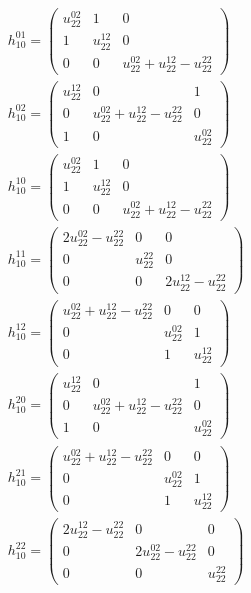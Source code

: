 \documentclass[a4paper, 11pt, twoside, onecolumn]{article}
\begin{document}
\begin{landscape}
\begin{gather*}
	 h_10^{01}=\begin{pmatrix}u^{02}_{22} & 1 & 0\\1 & u^{12}_{22} & 0\\0 & 0 & u^{02}_{22} + u^{12}_{22} - u^{22}_{22}\end{pmatrix}\\ 
	 h_10^{02}=\begin{pmatrix}u^{12}_{22} & 0 & 1\\0 & u^{02}_{22} + u^{12}_{22} - u^{22}_{22} & 0\\1 & 0 & u^{02}_{22}\end{pmatrix}\\ 
	 h_10^{10}=\begin{pmatrix}u^{02}_{22} & 1 & 0\\1 & u^{12}_{22} & 0\\0 & 0 & u^{02}_{22} + u^{12}_{22} - u^{22}_{22}\end{pmatrix}\\ 
	 h_10^{11}=\begin{pmatrix}2 u^{02}_{22} - u^{22}_{22} & 0 & 0\\0 & u^{22}_{22} & 0\\0 & 0 & 2 u^{12}_{22} - u^{22}_{22}\end{pmatrix}\\ 
	 h_10^{12}=\begin{pmatrix}u^{02}_{22} + u^{12}_{22} - u^{22}_{22} & 0 & 0\\0 & u^{02}_{22} & 1\\0 & 1 & u^{12}_{22}\end{pmatrix}\\ 
	 h_10^{20}=\begin{pmatrix}u^{12}_{22} & 0 & 1\\0 & u^{02}_{22} + u^{12}_{22} - u^{22}_{22} & 0\\1 & 0 & u^{02}_{22}\end{pmatrix}\\ 
	 h_10^{21}=\begin{pmatrix}u^{02}_{22} + u^{12}_{22} - u^{22}_{22} & 0 & 0\\0 & u^{02}_{22} & 1\\0 & 1 & u^{12}_{22}\end{pmatrix}\\ 
	 h_10^{22}=\begin{pmatrix}2 u^{12}_{22} - u^{22}_{22} & 0 & 0\\0 & 2 u^{02}_{22} - u^{22}_{22} & 0\\0 & 0 & u^{22}_{22}\end{pmatrix}\\ 

\end{gather*}
\end{landscape}
\end{document}
